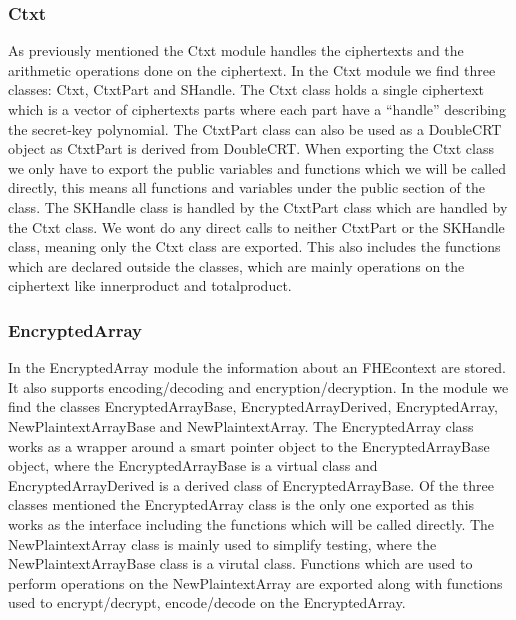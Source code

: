 \subsubsection{Ctxt}
As previously mentioned the Ctxt module handles the ciphertexts and the arithmetic operations done on the ciphertext. In the Ctxt module we find three classes: Ctxt, CtxtPart and SHandle. The Ctxt class holds a single ciphertext which is a vector of ciphertexts parts where each part have a ``handle'' describing the secret-key polynomial. The CtxtPart class can also be used as a DoubleCRT object as CtxtPart is derived from DoubleCRT. When exporting the Ctxt class we only have to export the public variables and functions which we will be called directly, this means all functions and variables under the public section of the class. The SKHandle class is handled by the CtxtPart class which are handled by the Ctxt class. We wont do any direct calls to neither CtxtPart or the SKHandle class, meaning only the Ctxt class are exported. This also includes the functions which are declared outside the classes, which are mainly operations on the ciphertext like innerproduct and totalproduct.

\subsubsection{EncryptedArray}
In the EncryptedArray module the information about an FHEcontext are stored. It also supports encoding/decoding and encryption/decryption. In the module we find the classes EncryptedArrayBase, EncryptedArrayDerived, EncryptedArray, NewPlaintextArrayBase and NewPlaintextArray. The EncryptedArray class works as a wrapper around a smart pointer object to the EncryptedArrayBase object, where the EncryptedArrayBase is a virtual class and EncryptedArrayDerived is a derived class of EncryptedArrayBase. Of the three classes mentioned the EncryptedArray class is the only one exported as this works as the interface including the functions which will be called directly. The NewPlaintextArray class is mainly used to simplify testing, where the NewPlaintextArrayBase class is a virutal class. Functions which are used to perform operations on the NewPlaintextArray are exported along with functions used to encrypt/decrypt, encode/decode on the EncryptedArray.

